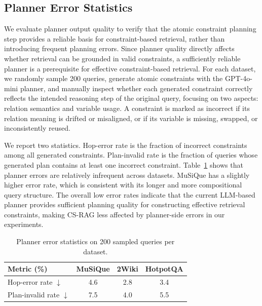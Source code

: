 \documentclass{article}
\theoremstyle{plain}
\theoremstyle{definition}
\theoremstyle{remark}
\begin{document}
\subsection{Planner Error Statistics}
\label{app:planner_error_stats}

We evaluate planner output quality to verify that the atomic constraint planning step provides a reliable basis for constraint-based retrieval, rather than introducing frequent planning errors.
Since planner quality directly affects whether retrieval can be grounded in valid constraints, a sufficiently reliable planner is a prerequisite for effective constraint-based retrieval.
For each dataset, we randomly sample 200 queries, generate atomic constraints with the GPT-4o-mini planner, and manually inspect whether each generated constraint correctly reflects the intended reasoning step of the original query, focusing on two aspects: relation semantics and variable usage.
A constraint is marked as incorrect if its relation meaning is drifted or misaligned, or if its variable is missing, swapped, or inconsistently reused.

We report two statistics.
Hop-error rate is the fraction of incorrect constraints among all generated constraints.
Plan-invalid rate is the fraction of queries whose generated plan contains at least one incorrect constraint.
Table~\ref{tab:planner_error_stats} shows that planner errors are relatively infrequent across datasets.
MuSiQue has a slightly higher error rate, which is consistent with its longer and more compositional query structure.
The overall low error rates indicate that the current LLM-based planner provides sufficient planning quality for constructing effective retrieval constraints, making CS-RAG less affected by planner-side errors in our experiments.

\begin{table}[h]
\centering
\small
\setlength{\tabcolsep}{8pt}
\caption{Planner error statistics on 200 sampled queries per dataset.}
\begin{tabular}{l ccc}
\toprule
Metric (\%) & MuSiQue & 2Wiki & HotpotQA \\
\midrule
Hop-error rate $\downarrow$ & 4.6 & 2.8 & 3.4 \\
Plan-invalid rate $\downarrow$            & 7.5 & 4.0 & 5.5 \\
\bottomrule
\end{tabular}

\label{tab:planner_error_stats}
\end{table}
\end{document}
